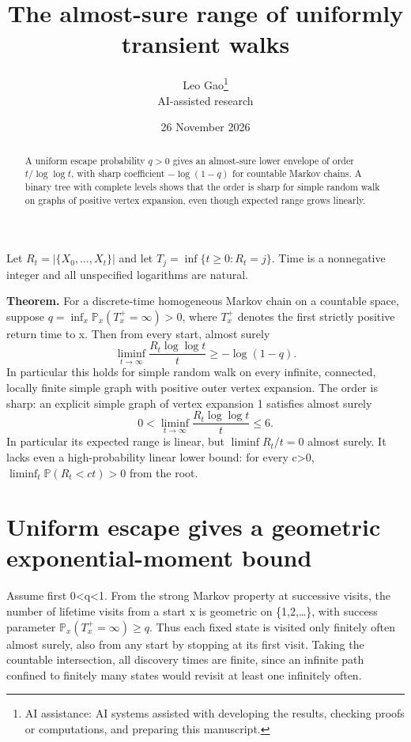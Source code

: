 \documentclass[11pt]{article}
\title{\textcolor{ink}{The almost-sure range of uniformly transient walks}}
\author{Leo Gao\thanks{AI assistance: AI systems assisted with developing the results, checking proofs or computations, and preparing this manuscript.}\\[3pt]\small\textsf{AI-assisted research}}
\date{26 November 2026}
\begin{document}
\maketitle
\begin{abstract}
A uniform escape probability \(q>0\) gives an almost-sure lower envelope of order \(t/\log\log t\), with sharp coefficient \(-\log(1-q)\) for countable Markov chains. A binary tree with complete levels shows that the order is sharp for simple random walk on graphs of positive vertex expansion, even though expected range grows linearly.
\end{abstract}
Let \(R_t=|\{X_0,\ldots,X_t\}|\) and let \(T_j=\inf\{t\ge0:R_t=j\}\). Time is a nonnegative integer and all unspecified logarithms are natural.

\textbf{Theorem.} For a discrete-time homogeneous Markov chain on a countable space, suppose \(q = \inf _x \mathbb{P}_x(T_x^+ = \infty )>0\), where \(T_x^+\) denotes the first strictly positive return time to x. Then from every start, almost surely
\[
\liminf_{t\to\infty}\frac{R_t\log\log t}{t}\ge -\log(1-q).
\]
In particular this holds for simple random walk on every infinite, connected, locally finite simple graph with positive outer vertex expansion. The order is sharp: an explicit simple graph of vertex expansion 1 satisfies almost surely
\[
0<\liminf_{t\to\infty}\frac{R_t\log\log t}{t}\le 6.
\]
In particular its expected range is linear, but \(\liminf  R_t/t = 0\) almost surely. It lacks even a high-probability linear lower bound: for every c\textgreater0, \(\liminf_t \mathbb{P}(R_t<ct)>0\) from the root.

\section{Uniform escape gives a geometric exponential-moment bound}\label{uniform-escape-gives-a-geometric-exponential-moment-bound}

Assume first 0\textless q\textless1. From the strong Markov property at successive visits, the number of lifetime visits from a start x is geometric on \{1,2,\ldots\}, with success parameter \(\mathbb{P}_x(T_x^+=\infty ) \ge  q\). Thus each fixed state is visited only finitely often almost surely, also from any start by stopping at its first visit. Taking the countable intersection, all discovery times are finite, since an infinite path confined to finitely many states would revisit at least one infinitely often.
\end{document}
